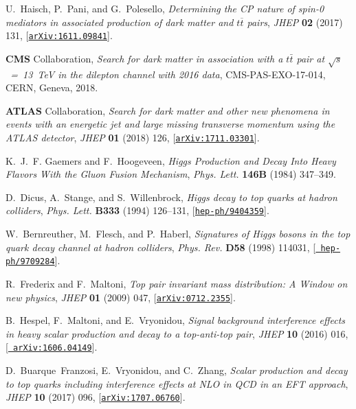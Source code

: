 \documentclass[review]{elsarticle}
\begin{document}
\begin{thebibliography}{100}
U.~Haisch, P.~Pani, and G.~Polesello, {\it {Determining the CP nature of spin-0
  mediators in associated production of dark matter and $ t\overline{t} $
  pairs}},  {\em JHEP} {\bf 02} (2017) 131,
  [\href{http://arxiv.org/abs/1611.09841}{{\tt arXiv:1611.09841}}].

{\bf CMS} Collaboration, {\it {Search for dark matter in association with a $t
  \bar t$ pair at $\sqrt{s}$~=~13~TeV in the dilepton channel with 2016
  data}}, CMS-PAS-EXO-17-014, CERN, Geneva, 2018.

{\bf ATLAS} Collaboration, {\it {Search for dark matter and
  other new phenomena in events with an energetic jet and large missing
  transverse momentum using the ATLAS detector}},  {\em JHEP} {\bf 01} (2018)
  126, [\href{http://arxiv.org/abs/1711.03301}{{\tt arXiv:1711.03301}}].

K.~J.~F. Gaemers and F.~Hoogeveen, {\it {Higgs Production and Decay Into Heavy
  Flavors With the Gluon Fusion Mechanism}},  {\em Phys. Lett.} {\bf 146B}
  (1984) 347--349.

D.~Dicus, A.~Stange, and S.~Willenbrock, {\it {Higgs decay to top quarks at
  hadron colliders}},  {\em Phys. Lett.} {\bf B333} (1994) 126--131,
  [\href{http://arxiv.org/abs/hep-ph/9404359}{{\tt hep-ph/9404359}}].

W.~Bernreuther, M.~Flesch, and P.~Haberl, {\it {Signatures of Higgs bosons in
  the top quark decay channel at hadron colliders}},  {\em Phys. Rev.} {\bf
  D58} (1998) 114031, [\href{http://arxiv.org/abs/hep-ph/9709284}{{\tt
  hep-ph/9709284}}].

R.~Frederix and F.~Maltoni, {\it {Top pair invariant mass distribution: A
  Window on new physics}},  {\em JHEP} {\bf 01} (2009) 047,
  [\href{http://arxiv.org/abs/0712.2355}{{\tt arXiv:0712.2355}}].

B.~Hespel, F.~Maltoni, and E.~Vryonidou, {\it {Signal background interference
  effects in heavy scalar production and decay to a top-anti-top pair}},  {\em
  JHEP} {\bf 10} (2016) 016, [\href{http://arxiv.org/abs/1606.04149}{{\tt
  arXiv:1606.04149}}].

D.~Buarque~Franzosi, E.~Vryonidou, and C.~Zhang, {\it {Scalar production and
  decay to top quarks including interference effects at NLO in QCD in an EFT
  approach}},  {\em JHEP} {\bf 10} (2017) 096,
  [\href{http://arxiv.org/abs/1707.06760}{{\tt arXiv:1707.06760}}].


\end{thebibliography}
\end{document}

